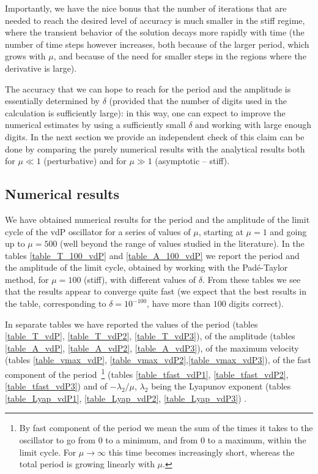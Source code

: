 \documentclass[final]{article}
\begin{document}
Importantly, we have the nice bonus that the number of iterations that are needed to reach the desired level of accuracy is much smaller in the stiff regime, where the transient behavior of the solution decays more rapidly with time
(the number of time steps however increases, both because of the larger period, which grows with $\mu$, and because of the need for smaller steps in the regions where the derivative is large).

The accuracy that we can hope to reach for the period and the amplitude is essentially determined by 
$\delta$ (provided that the number of digits used in the calculation is sufficiently large): in this way, one
can expect to improve the numerical estimates by using a sufficiently small $\delta$ and working with large enough digits. In the next section we provide an independent check of this claim can be done by comparing the purely numerical results with the analytical results both for $\mu \ll 1$ (perturbative) and for $\mu \gg 1$ (asymptotic -- stiff).



\subsection{Numerical results}
\label{sec:num}

We have obtained numerical results for the period and the amplitude of the limit cycle of the vdP oscillator for a series of values of $\mu$, starting at $\mu=1$ and going up to $\mu=500$ (well beyond the range of values studied in the literature). 
In the tables \ref{table_T_100_vdP}  and \ref{table_A_100_vdP} we report the period and the amplitude of the limit cycle, obtained by working with the Pad\'e-Taylor method, for $\mu = 100$ (stiff), with different values of $\delta$. 
From these tables we see that the results appear to converge quite fast (we expect that the best results in the table, corresponding to $\delta=10^{-100}$, have more than $100$ digits correct).

In separate tables we have reported the values of the period (tables \ref{table_T_vdP}, \ref{table_T_vdP2}, \ref{table_T_vdP3}), 
of the amplitude (tables \ref{table_A_vdP}, \ref{table_A_vdP2}, \ref{table_A_vdP3}), of  the maximum velocity 
(tables \ref{table_vmax_vdP}, \ref{table_vmax_vdP2},\ref{table_vmax_vdP3}), of the fast component of the period~\footnote{By fast component of the period we mean the sum of the times it takes to the oscillator to go from $0$ to a minimum, and from
	$0$ to a maximum, within the limit cycle. For $\mu  \rightarrow \infty$ this time becomes increasingly short, whereas the total period is growing linearly with $\mu$.}
(tables \ref{table_tfast_vdP1}, \ref{table_tfast_vdP2}, \ref{table_tfast_vdP3}) and of $-\lambda_2/\mu$, $\lambda_2$ being the Lyapunov exponent (tables \ref{table_Lyap_vdP1}, \ref{table_Lyap_vdP2}, \ref{table_Lyap_vdP3}) . 
\end{document}
